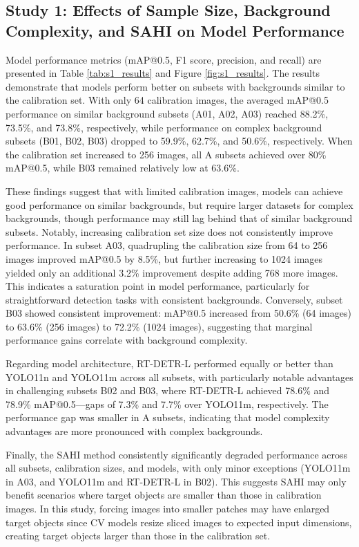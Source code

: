 \subsection{Study 1: Effects of Sample Size, Background Complexity, and SAHI on Model Performance}

Model performance metrics (mAP@0.5, F1 score, precision, and recall) are presented in Table \ref{tab:s1_results} and Figure \ref{fig:s1_results}. The results demonstrate that models perform better on subsets with backgrounds similar to the calibration set. With only 64 calibration images, the averaged mAP@0.5 performance on similar background subsets (A01, A02, A03) reached 88.2\%, 73.5\%, and 73.8\%, respectively, while performance on complex background subsets (B01, B02, B03) dropped to 59.9\%, 62.7\%, and 50.6\%, respectively. When the calibration set increased to 256 images, all A subsets achieved over 80\% mAP@0.5, while B03 remained relatively low at 63.6\%.

These findings suggest that with limited calibration images, models can achieve good performance on similar backgrounds, but require larger datasets for complex backgrounds, though performance may still lag behind that of similar background subsets. Notably, increasing calibration set size does not consistently improve performance. In subset A03, quadrupling the calibration size from 64 to 256 images improved mAP@0.5 by 8.5\%, but further increasing to 1024 images yielded only an additional 3.2\% improvement despite adding 768 more images. This indicates a saturation point in model performance, particularly for straightforward detection tasks with consistent backgrounds.
Conversely, subset B03 showed consistent improvement: mAP@0.5 increased from 50.6\% (64 images) to 63.6\% (256 images) to 72.2\% (1024 images), suggesting that marginal performance gains correlate with background complexity.

Regarding model architecture, RT-DETR-L performed equally or better than YOLO11n and YOLO11m across all subsets, with particularly notable advantages in challenging subsets B02 and B03, where RT-DETR-L achieved 78.6\% and 78.9\% mAP@0.5—gaps of 7.3\% and 7.7\% over YOLO11m, respectively. The performance gap was smaller in A subsets, indicating that model complexity advantages are more pronounced with complex backgrounds.

Finally, the SAHI method consistently significantly degraded performance across all subsets, calibration sizes, and models, with only minor exceptions (YOLO11m in A03, and YOLO11m and RT-DETR-L in B02). This suggests SAHI may only benefit scenarios where target objects are smaller than those in calibration images. In this study, forcing images into smaller patches may have enlarged target objects since CV models resize sliced images to expected input dimensions, creating target objects larger than those in the calibration set.


